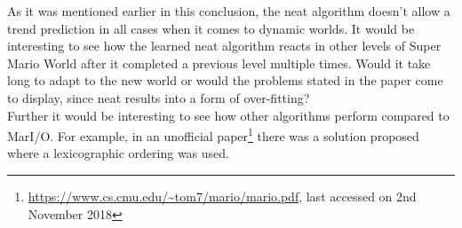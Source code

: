 As it was mentioned earlier in this conclusion, the \gls{neat} algorithm doesn't allow a trend prediction in all cases when it comes to dynamic worlds. It would be interesting to see how the learned \gls{neat} algorithm reacts in other levels of Super Mario World after it completed a previous level multiple times. Would it take long to adapt to the new world or would the problems stated in the paper \cite{kohl_integrated_2011} come to display, since \gls{neat} results into a form of over-fitting?\\
Further it would be interesting to see how other algorithms perform compared to MarI/O. For example, in an unofficial paper\footnote{\url{https://www.cs.cmu.edu/~tom7/mario/mario.pdf}, last accessed on 2nd November 2018} there was a solution proposed where a lexicographic ordering was used.\\